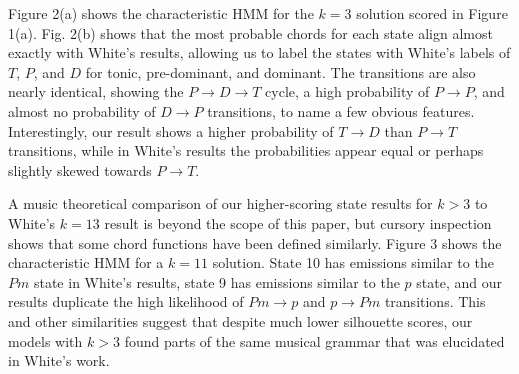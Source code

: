 \documentclass[letterpaper]{article}
\begin{document}
Figure 2(a) shows the characteristic HMM for the $k=3$ solution scored in Figure 1(a). Fig. 2(b) shows that the most probable chords for each state align almost exactly with White's results, allowing us to label the states with White's labels of $T$, $P$, and $D$ for tonic, pre-dominant, and dominant. The transitions are also nearly identical, showing the $P\to D \to T$ cycle, a high probability of $P\to P$, and almost no probability of $D\to P$ transitions, to name a few obvious features. Interestingly, our result shows a higher probability of $T\to D$ than $P\to T$ transitions, while in White's results the probabilities appear equal or perhaps slightly skewed towards $P\to T$.

A music theoretical comparison of our higher-scoring state results for $k > 3$ to White's $k=13$ result is beyond the scope of this paper, but cursory inspection shows that some chord functions have been defined similarly. Figure 3 shows the characteristic HMM for a $k=11$ solution. State 10 has emissions similar to the $Pm$ state in White's results, state 9 has emissions similar to the $p$ state, and our results duplicate the high likelihood of $Pm \to p$ and $p \to Pm$ transitions. This and other similarities suggest that despite much lower silhouette scores, our models with $k > 3$ found parts of the same musical grammar that was elucidated in White's work.
\end{document}
